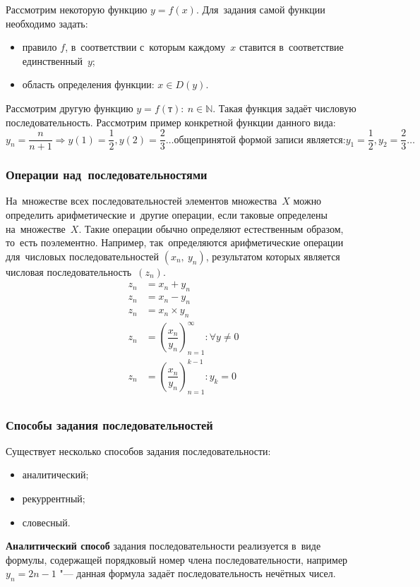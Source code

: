 \documentclass[]{scrartcl}
\begin{document}
Рассмотрим некоторую функцию ${\textstyle y=f(x)}$. Для~задания самой функции необходимо задать:
	\begin{itemize}
		\item правило ${\textstyle f}$, в~соответствии с~которым каждому~${\textstyle x}$ ставится в~соответствие единственный~${\textstyle y}$;
		\item область определения функции: ${\textstyle x \in D(y)}$.
	\end{itemize}
Рассмотрим другую функцию ${\textstyle y=f(т):\ n \in \mathbb{N}}$. Такая функция задаёт числовую последовательность. Рассмотрим пример конкретной функции данного вида:
\begin{equation*}\label{eq:numerical-sequence-example}
y_n=\frac{n}{n+1}\Rightarrow y(1)=\frac{1}{2}, y(2)=\frac{2}{3}\ldots \text{общепринятой формой записи является:} y_1=\frac{1}{2}, y_2=\frac{2}{3}\ldots
\end{equation*}

\subsubsection{Операции над~последовательностями}
На~множестве всех последовательностей элементов множества~${\textstyle X}$ можно определить арифметические и~другие операции, если таковые определены на~множестве~${\textstyle X}$. Такие операции обычно определяют естественным образом, то~есть поэлементно. Например, так~определяются арифметические операции для~числовых последовательностей ${\textstyle (x_n,\ y_n)}$, результатом которых является числовая последовательность~${\textstyle (z_n)}$.
\begin{equation}\label{eq:numerical-sequences-arifmetic}
	\begin{aligned}
	z_n&=x_n + y_n\\
	z_n&=x_n - y_n\\
	z_n&=x_n \times y_n\\
	z_n&=(\dfrac{x_n}{y_n})_{n=1}^\infty:\forall y\neq 0\\
	z_n&=(\dfrac{x_n}{y_n})_{n=1}^{k-1}:y_k=0\\
	\end{aligned}
\end{equation} 

\subsubsection{Способы задания последовательностей}
Существует несколько способов задания последовательности:
\begin{itemize}
	\item аналитический;
	\item рекуррентный;
	\item словесный.
	\end{itemize}
\textbf{Аналитический способ} задания последовательности реализуется в~виде формулы, содержащей порядковый номер члена последовательности, например ${\textstyle y_n=2n-1}$ "--- данная формула задаёт последовательность нечётных чисел.
\end{document}
